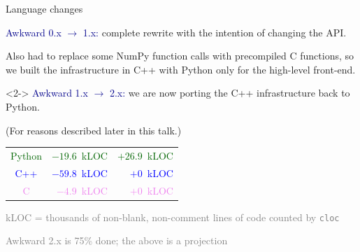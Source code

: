 \documentclass[aspectratio=169]{beamer}
\begin{document}
\begin{frame}{Language changes}
\large
\vspace{0.5 cm}

\textcolor{darkblue}{Awkward 0.x $\to$ 1.x:} complete rewrite with the intention of changing the API.

\vspace{0.25 cm}
Also had to replace some NumPy function calls with precompiled C functions, so we built the infrastructure in C++ with Python only for the high-level front-end.

\vspace{1 cm}
\begin{uncoverenv}<2->
\textcolor{darkblue}{Awkward 1.x $\to$ 2.x:} we are now porting the C++ infrastructure back to Python.

\vspace{0.25 cm}
(For reasons described later in this talk.)

\vspace{0.25 cm}
\begin{center}
\begin{tabular}{c r r}
\textcolor{darkgreen}{Python} & \textcolor{darkgreen}{$-19.6$~kLOC} & \textcolor{darkgreen}{$+26.9$~kLOC} \\
\textcolor{blue}{C++} & \textcolor{blue}{$-59.8$~kLOC} & \textcolor{blue}{$+0$~kLOC} \\
\textcolor{violet}{C} & \textcolor{violet}{$-4.9$~kLOC} & \textcolor{violet}{$+0$~kLOC} \\
\end{tabular}

\vspace{0.25 cm}
\textcolor{gray}{\scriptsize kLOC = thousands of non-blank, non-comment lines of code counted by \texttt{cloc}}

\textcolor{gray}{\scriptsize Awkward 2.x is 75\% done; the above is a projection}
\end{center}
\end{uncoverenv}
\end{frame}
\end{document}
